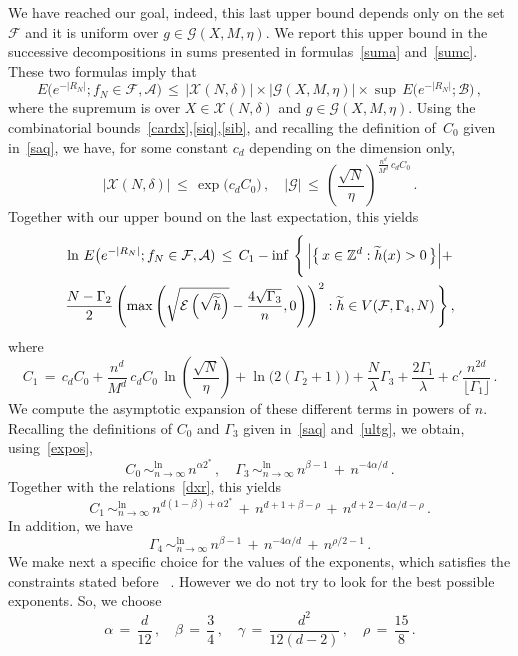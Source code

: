 \documentclass[10pt]{amsart}
\theoremstyle{definition}\newtheorem{defi}[theo]{Definition}\newtheorem{rema}[theo]{Remark}\newtheorem{exam}[theo]{Example}\newtheorem{exem}[theo]{Example}\newtheorem{nota}[theo]{Notation}
\newcommand*\lsim{\mathop{\sim}^{\ln}_{n\to\infty}}
\newcommand*\Zd {{\mathbb Z^d}}
\newcommand*\wh{{\tilde h}}
\newcommand{\cA}{\mathcal{A}}
\newcommand{\cB}{\mathcal{B}}
\newcommand{\cE}{\mathcal{E}}
\newcommand{\cF}{\mathcal{F}}
\newcommand{\cG}{\mathcal{G}}
\newcommand{\cX}{\mathcal{X}}
\let\oldtilde\tilde
\renewcommand*{\tilde}[1]{\mathchoice{\widetilde{#1}}{\widetilde{#1}}{\oldtilde{#1}}{\oldtilde{#1}}}\let\oldhat\hat
\renewcommand*{\hat}[1]{\mathchoice{\widehat{#1}}{\widehat{#1}}{\oldhat{#1}}{\oldhat{#1}}}\let\oldexists\exists
\renewcommand*{\exists}{\mathrel{\oldexists}}
\begin{document}
We have reached our goal, indeed, this last upper bound depends only on the set~$\cF$ and it is uniform over $g\in
\cG(X,M,\eta)$. We report this upper bound in the successive decompositions in sums presented in formulas~\eqref{suma} and~\eqref{sumc}. These two formulas imply that
\[
E\big(e^{-|R_N|}; f_N\in\cF,\cA)\,\leq\,
\big|{\cX(N,\delta)}\big|\times
\big|{\cG(X,M,\eta)}\big|\times
\sup\, E\big(e^{-|R_N|};
\cB
\big)
\,,
\]
where the supremum is over $X\in{\cX(N,\delta)}$ and $g \in{\cG(X,M,\eta)}$. Using the combinatorial bounds~\eqref{cardx},\eqref{siq},\eqref{sib}, and recalling the definition of~$C_0$ given in~\eqref{saq}, we have, for some constant $c_d$ depending on the dimension only,
\[
\big|
\cX(N,\delta)
\big|\,\leq\,
\exp\big(c_dC_0\big)\,,\quad |\cG|
\,\leq\,
\left(\frac{\sqrt{N}}{\eta}\right)^{\displaystyle
\frac{n^d}{M^d}\,c_dC_0}\,.
\]
Together with our upper bound on the last expectation, this yields
\begin{multline}\label{gou}
\ln\,E\big(e^{-|R_N|}; f_N\in\cF,\cA)\,\leq\, C_1-
\inf\,\Bigg\{\,
\Big|\big\{\,x\in\Zd:\wh(x)>0\,\big\}\Big| +
\\
\frac{N-\Gamma_2}{2}
\left(\max\left(
\sqrt{\cE\left(\sqrt{\widetilde h}\right)}-
\frac{4\sqrt{\Gamma_3}}{n},0\right) \right)^2 : \wh\in V(\cF,\Gamma_4,N)
\,\Bigg\}
\,,
\end{multline}
where
\[
C_1\,=\,
c_dC_0+
\frac{n^d}{M^d}\,c_dC_0\,\ln
\left(\frac{\sqrt{N}}{\eta}\right)+
\ln\big(2(\Gamma_2+1)\big)+
\frac{N}{\lambda}\Gamma_3 +\frac{2\Gamma_1}{\lambda} + c'\frac{n^{2d}}{\lfloor\Gamma_1\rfloor}
\,.
\]
We compute the asymptotic expansion of these different terms in powers of $n$. Recalling the definitions of $C_0$ and $\Gamma_3$ given in~\eqref{saq} and~\eqref{ultg}, we obtain, using~\eqref{expos},
\begin{equation}\label{fxr}
C_0\,\lsim\,n^{\alpha 2^*}\,,\quad
\Gamma_3\,\lsim\, n^{\beta-1}\,+
\,n^{-4\alpha/d}\,.
\end{equation}
Together with the relations~\eqref{dxr}, this yields
\begin{equation}\label{vxr}
C_1\,\lsim\,n^{d(1-\beta)+\alpha 2^*}
\,+\,n^{d+1+\beta-\rho }
\,+\,n^{d+2-4\alpha/d-\rho }
\,.
\end{equation}
In addition, we have
\[
\Gamma_4\,\lsim\,
n^{\beta-1}\,+
\,n^{-4\alpha/d}\,+
\,n^{\rho/2-1}\,.
\]
We make next a specific choice for the values of the exponents, which satisfies the constraints stated before~\label{expo}
. However we do not try to look for the best possible exponents. So, we choose
\begin{equation}\label{choi}
\alpha\,=\,\frac{d}{12}\,,\quad
\beta\,=\,\frac{3}{4}\,,\quad
\gamma\,=\,\frac{d^2}{12(d-2)}\,,\quad
\rho\,=\,\frac{15}{8}\,.
\end{equation}
\end{document}
